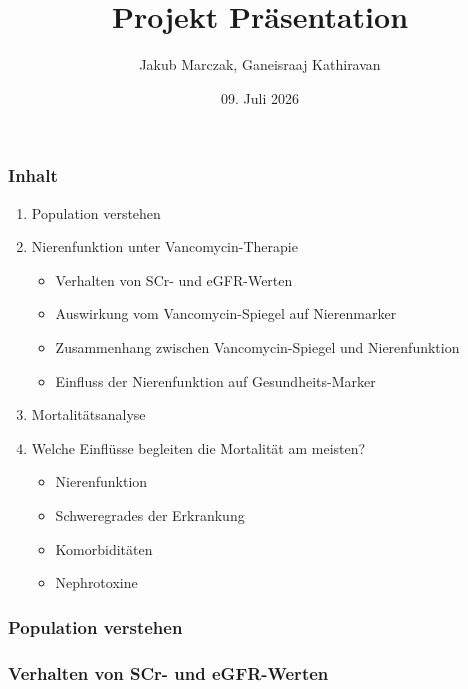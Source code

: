 \documentclass[10pt, aspectratio=169]{beamer}
\date{09. Juli 2026}
\title{Projekt \MakeUppercase{\romannumeral 5} Präsentation}
\author[J. Marczak, G. Kathiravan]{Jakub Marczak, Ganeisraaj Kathiravan}
\begin{document}
\begin{frame}[plain]
  \titlepage
\end{frame}

\begin{frame}
    \frametitle{Inhalt}
    \begin{enumerate}
        \item Population verstehen
        \item Nierenfunktion unter Vancomycin-Therapie
        \begin{itemize} 
        \item[$\rightarrow$] Verhalten von SCr- und eGFR-Werten
        \item[$\rightarrow$] Auswirkung vom Vancomycin-Spiegel auf Nierenmarker
        \item[$\rightarrow$] Zusammenhang zwischen Vancomycin-Spiegel und Nierenfunktion
        \item[$\rightarrow$] Einfluss der Nierenfunktion auf Gesundheits-Marker
      \end{itemize}
        \item Mortalitätsanalyse
        \item[$\rightarrow$] Welche Einflüsse begleiten die Mortalität am meisten?
        \begin{itemize}
            \item Nierenfunktion
            \item Schweregrades der Erkrankung
            \item Komorbiditäten
            \item Nephrotoxine
        \end{itemize}
    \end{enumerate}
\end{frame}

\begin{frame}
    \frametitle{Population verstehen}
\end{frame}

\begin{frame}
    \frametitle{Verhalten von SCr- und eGFR-Werten}
\end{frame}
\end{document}
